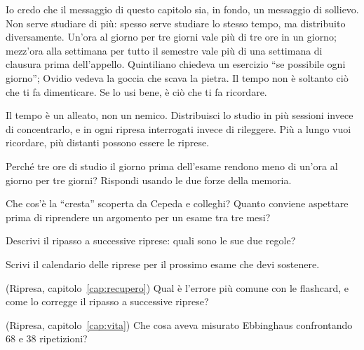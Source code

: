 \asterismo

Io credo che il messaggio di questo capitolo sia, in fondo, un
messaggio di sollievo. Non serve studiare di più: spesso serve
studiare lo stesso tempo, ma distribuito diversamente. Un'ora al giorno
per tre giorni vale più di tre ore in un giorno; mezz'ora alla
settimana per tutto il semestre vale più di una settimana di clausura
prima dell'appello. Quintiliano chiedeva un esercizio \enquote{se
possibile ogni giorno}; Ovidio vedeva la goccia che scava la pietra. Il
tempo non è soltanto ciò che ti fa dimenticare. Se lo usi bene, è ciò
che ti fa ricordare.

\begin{daricordare}
Il tempo è un alleato, non un nemico. Distribuisci lo studio in più
sessioni invece di concentrarlo, e in ogni ripresa interrogati invece
di rileggere. Più a lungo vuoi ricordare, più distanti possono essere
le riprese.
\end{daricordare}

\begin{domande}
  \item Perché tre ore di studio il giorno prima dell'esame rendono
        meno di un'ora al giorno per tre giorni? Rispondi usando le
        due forze della memoria.
  \item Che cos'è la \enquote{cresta} scoperta da Cepeda e colleghi?
        Quanto conviene aspettare prima di riprendere un argomento per
        un esame tra tre mesi?
  \item Descrivi il ripasso a successive riprese: quali sono le sue due
        regole?
  \item Scrivi il calendario delle riprese per il prossimo esame che
        devi sostenere.
  \item (Ripresa, capitolo~\ref{cap:recupero}) Qual è l'errore più
        comune con le flashcard, e come lo corregge il ripasso a
        successive riprese?
  \item (Ripresa, capitolo~\ref{cap:vita}) Che cosa aveva misurato
        Ebbinghaus confrontando 68 e 38 ripetizioni?
\end{domande}

